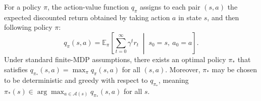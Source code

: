 \documentclass{article}
\begin{document}
For a policy \(\pi\), the action-value function $q_\pi$ assigns to each pair $(s,a)$ the expected discounted return obtained by taking action \(a\) in state \(s\), and then following policy \(\pi\):
\[
q_\pi(s,a)
=
\mathbb E_{\pi} \left[
\sum_{t=0}^{\infty} \gamma^t r_t
\;\middle|\;
s_0 = s,\
a_0 = a
\right].
\]
Under standard finite-MDP assumptions,
there exists an optimal policy $\pi_*$ that satisfies $q_{\pi_*}(s,a) = \max_\pi q_\pi(s,a)$ for all $(s,a)$.
Moreover, $\pi_*$ may be chosen to be deterministic and greedy with respect to $q_{\pi_*}$, meaning
$\pi_*(s) \in \arg\max_{a \in \mathcal A(s)} q_{\pi_*}(s,a)$ for all $s$.

\end{document}
